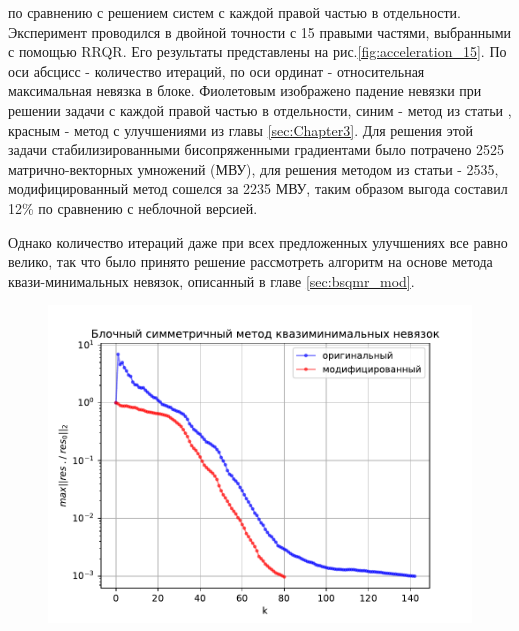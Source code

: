 по сравнению с решением систем с каждой правой частью в отдельности. Эксперимент проводился в двойной точности с 15 правыми частями,
выбранными с помощью RRQR. Его результаты представлены на рис.\ref{fig:acceleration_15}. По оси абсцисс - количество итераций, по оси
ординат - относительная максимальная невязка в блоке. Фиолетовым изображено падение невязки при решении задачи с каждой правой частью 
в отдельности, синим - метод из статьи \cite{elGuennouni2003}, красным - метод с улучшениями из главы \ref{sec:Chapter3}. Для решения этой задачи
стабилизированными бисопряженными градиентами было потрачено 2525 матрично-векторных умножений (МВУ), для решения методом из статьи \cite{elGuennouni2003} - 2535, модифицированный
метод сошелся за 2235 МВУ, таким образом выгода составил 12\% по сравнению с неблочной версией.

\par Однако количество итераций даже при всех предложенных улучшениях все равно велико, так что
было принято решение рассмотреть алгоритм на основе метода квази-минимальных невязок, описанный 
в главе \ref{sec:bsqmr_mod}. 

\begin{figure}[H]
    \centering
    \includegraphics[width=0.7\linewidth]{images/bsqmr_reorth2_base_double_45.pdf}
    \caption{}
    \label{fig:bsqmr_reorth2_base_double_45}
\end{figure}

